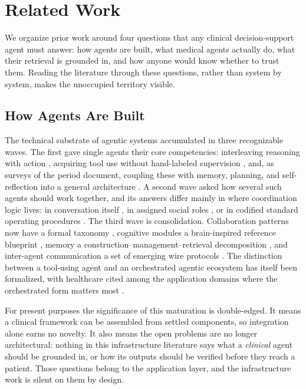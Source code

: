 \section{Related Work}

We organize prior work around four questions that any clinical decision-support agent must
answer: how agents are built, what medical agents actually do, what their retrieval is
grounded in, and how anyone would know whether to trust them. Reading the literature through
these questions, rather than system by system, makes the unoccupied territory visible.

\subsection{How Agents Are Built}

The technical substrate of agentic systems accumulated in three recognizable waves. The first
gave single agents their core competencies: interleaving reasoning with action
\cite{yao2023react}, acquiring tool use without hand-labeled supervision \cite{schick2023toolformer},
and, as surveys of the period document, coupling these with memory, planning, and
self-reflection into a general architecture \cite{wang2024survey,shinn2023reflexion}. A second
wave asked how several such agents should work together, and its answers differ mainly in
where coordination logic lives: in conversation itself \cite{wu2024autogen}, in assigned social
roles \cite{li2023camel}, or in codified standard operating procedures \cite{hong2024metagpt}. The
third wave is consolidation. Collaboration patterns now have a formal taxonomy
\cite{tran2025collaboration}, cognitive modules a brain-inspired reference blueprint
\cite{liu2025foundationagents}, memory a construction--management--retrieval decomposition
\cite{wu2025memory}, and inter-agent communication a set of emerging wire protocols
\cite{ehtesham2025protocols}. The distinction between a tool-using agent and an orchestrated
agentic ecosystem has itself been formalized, with healthcare cited among the application
domains where the orchestrated form matters most \cite{sapkota2025agents}.

For present purposes the significance of this maturation is double-edged. It means a clinical
framework can be assembled from settled components, so integration alone earns no novelty.
It also means the open problems are no longer architectural: nothing in this infrastructure
literature says what a \emph{clinical} agent should be grounded in, or how its outputs should be
verified before they reach a patient. Those questions belong to the application layer, and
the infrastructure work is silent on them by design.

